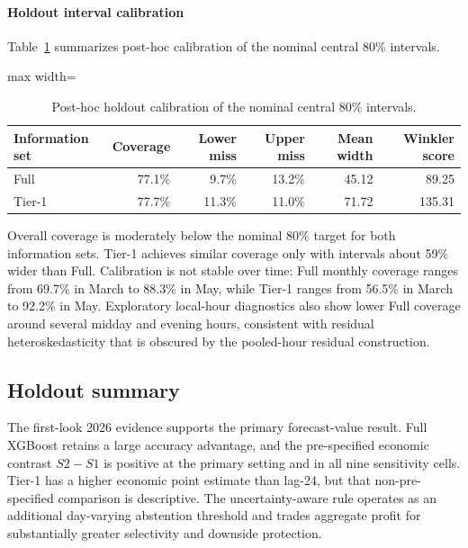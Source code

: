 \paragraph{Holdout interval calibration}
Table~\ref{tab:posthoc_calibration} summarizes post-hoc calibration of the nominal central 80\% intervals.

\begin{table}[htbp]
\centering
\caption{Post-hoc holdout calibration of the nominal central 80\% intervals.}
\label{tab:posthoc_calibration}
\begin{adjustbox}{max width=\textwidth}
\begin{tabular}{lrrrrr}
\toprule
Information set & Coverage & Lower miss & Upper miss & Mean width & Winkler score \\
\midrule
Full & 77.1\% & 9.7\% & 13.2\% & 45.12 & 89.25 \\
Tier-1 & 77.7\% & 11.3\% & 11.0\% & 71.72 & 135.31 \\
\bottomrule
\end{tabular}
\end{adjustbox}
\end{table}

Overall coverage is moderately below the nominal 80\% target for both information sets. Tier-1 achieves similar coverage only with intervals about 59\% wider than Full. Calibration is not stable over time: Full monthly coverage ranges from 69.7\% in March to 88.3\% in May, while Tier-1 ranges from 56.5\% in March to 92.2\% in May. Exploratory local-hour diagnostics also show lower Full coverage around several midday and evening hours, consistent with residual heteroskedasticity that is obscured by the pooled-hour residual construction.

\subsection{Holdout summary}

The first-look 2026 evidence supports the primary forecast-value result. Full XGBoost retains a large accuracy advantage, and the pre-specified economic contrast \(S2-S1\) is positive at the primary setting and in all nine sensitivity cells. Tier-1 has a higher economic point estimate than lag-24, but that non-pre-specified comparison is descriptive. The uncertainty-aware rule operates as an additional day-varying abstention threshold and trades aggregate profit for substantially greater selectivity and downside protection.
